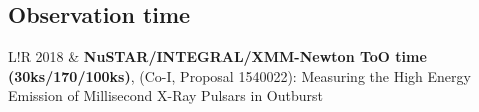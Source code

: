 \documentclass[10pt]{article}
\newcommand\VRule{\color{lightgray}\vrule width 0.5pt}
\begin{document}
%

\vspace{-5pt}
\subsection*{\phantom{sub} Observation time}
\begin{tabular}{L!{\VRule}R}
    2018 & \textbf{NuSTAR/INTEGRAL/XMM-Newton ToO time (30ks/170/100ks)}, (Co-I, Proposal 1540022): \small{Measuring the High Energy Emission of Millisecond X-Ray Pulsars in Outburst} \\
\end{tabular}
\end{document}
